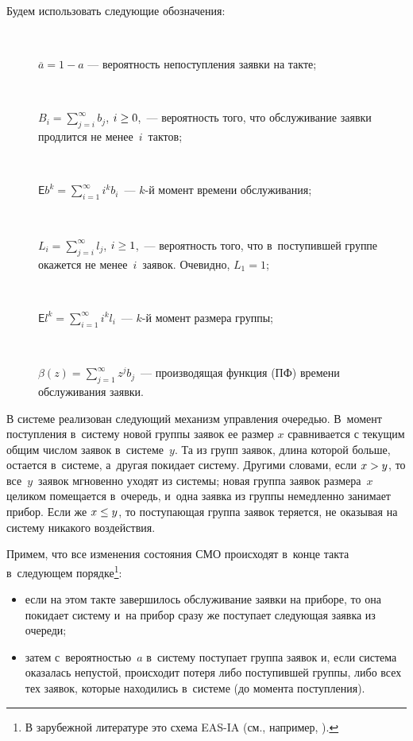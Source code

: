 \begin{multicols}{2}

Будем использовать следующие обозначения:
\begin{description}
\item[\,]
$\overline{a}=1-a$ --- вероятность непоступления заявки на такте;
\item[\,]
$B_i= \sum\nolimits_{j=i}^\infty b_j$, $i \hm\ge 0$,~--- вероятность 
того,
что обслуживание заявки продлится не менее~$i$~тактов;
\item[\,]
$\mathsf{E}b^k=\sum\nolimits_{i=1}^\infty i^k b_i$~--- $k$-й момент 
времени обслуживания;
\item[\,]
$L_i =\sum\nolimits_{j=i}^\infty l_j$, $i\hm\ge 1$,~---
вероятность того, что в~поступившей группе окажется не менее~$i$~заявок.
Очевидно, $L_1=1$;  
\item[\,]

$\mathsf{E}l^k=\sum\nolimits_{i=1}^\infty i^k l_i$~--- $k$-й момент 
размера группы;
\item[\,]
$\beta(z)=\sum\nolimits_{j=1}^\infty z^j b_j$~--- производящая функция 
(ПФ)
времени обслуживания заявки.
\end{description}


В системе реализован следующий механизм управления очередью. В~момент
поступления в~сис\-те\-му новой группы заявок ее размер $x$ сравнивается
с текущим общим числом заявок в~системе~$y$. Та из групп
заявок, длина которой больше, остается в~системе, а~другая
покидает систему. Другими словами, если $x\hm>y$, то все~$y$~заявок 
мгновенно
уходят из системы; новая группа заявок размера~$x$
целиком помещается в~очередь, и~одна заявка из группы немедленно занимает 
прибор.
Если же $x \hm\le y$, то поступающая группа заявок теряется,
не оказывая на систему никакого воздействия.

Примем, что все изменения состояния СМО происходят в~конце такта 
в~следующем порядке\footnote{В зарубежной литературе это схема EAS-IA 
(см., например, \cite[с.~2--3]{nobel}).}:
\begin{itemize}
\item если на этом такте завершилось обслуживание заявки на приборе, то 
она покидает систему
и~на прибор сразу же поступает следующая заявка из очереди;
\item затем с~вероятностью~$a$ в~систему поступает группа заявок и, если 
система оказалась непустой, происходит потеря либо поступившей группы, 
либо всех тех заявок, которые находились в~системе (до момента 
поступления).
\end{itemize}


\end{multicols}
